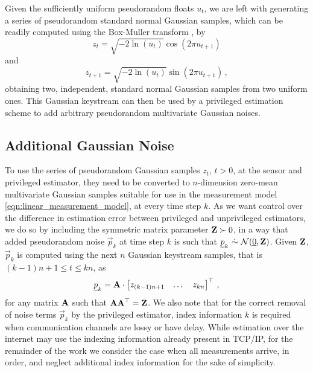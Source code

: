 \documentclass[letterpaper, 10 pt, conference]{ieeeconf}
\begin{document}
Given the sufficiently uniform pseudorandom floats $u_t$, we are left with generating a series of pseudorandom standard normal Gaussian samples, which can be readily computed using the Box-Muller transform \cite{paleyFourierTransformsComplex1934}, by
\begin{equation}
   z_t = \sqrt{-2\ln (u_t)}\cos(2\pi u_{t+1})
\end{equation}
and
\begin{equation}
   z_{t+1} = \sqrt{-2\ln (u_t)}\sin(2\pi u_{t+1})\,,
\end{equation}
obtaining two, independent, standard normal Gaussian samples from two uniform ones. This Gaussian keystream can then be used by a privileged estimation scheme to add arbitrary pseudorandom multivariate Gaussian noises.

% 
% 

\subsection{Additional Gaussian Noise}\label{subsec:adding_privilege_noise}
To use the series of pseudorandom Gaussian samples $z_t$, $t>0$, at the sensor and privileged estimator, they need to be converted to $n$-dimension zero-mean multivariate Gaussian samples suitable for use in the measurement model \eqref{eqn:linear_measurement_model}, at every time step $k$. As we want control over the difference in estimation error between privileged and unprivileged estimators, we do so by including the symmetric matrix parameter ${{\mathbf{Z}}}\succ 0$, in a way that added pseudorandom noise $\vec{p}_k$ at time step $k$ is such that $\vec{p}_k\ \dot{\sim}\ \mathcal{N}(\vec{0},\mat{Z})$. Given ${{\mathbf{Z}}}$, $\vec{p}_k$ is computed using the next $n$ Gaussian keystream samples, that is $(k-1)n+1\leq t\leq kn$, as
\begin{equation}
   {\underline{p}}_k = {{\mathbf{A}}}\cdot
   \begin{bmatrix}
      z_{(k-1)n+1} & \dots & z_{kn}
   \end{bmatrix}^\top\,,
\end{equation}
for any matrix ${{\mathbf{A}}}$ such that ${{\mathbf{A}}}{{\mathbf{A}}}^\top={{\mathbf{Z}}}$. We also note that for the correct removal of noise terms $\vec{p}_k$ by the privileged estimator, index information $k$ is required when communication channels are lossy or have delay. While estimation over the internet may use the indexing information already present in TCP/IP, for the remainder of the work we consider the case when all measurements arrive, in order, and neglect additional index information for the sake of simplicity.
\end{document}
